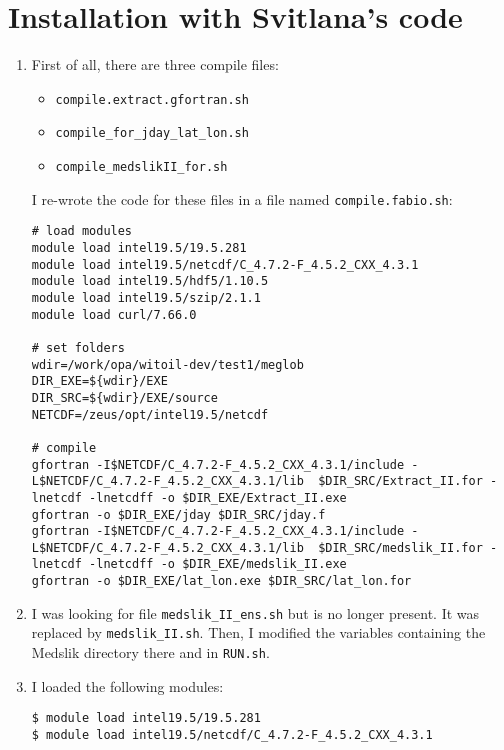 \section{Installation with Svitlana's code}

\begin{enumerate}
    \item First of all, there are three compile files:
\begin{itemize}
    \item \texttt{compile.extract.gfortran.sh}
    \item \texttt{compile\_for\_jday\_lat\_lon.sh}
    \item \texttt{compile\_medslikII\_for.sh}
\end{itemize}

I re-wrote the code for these files in a file named \texttt{compile.fabio.sh}:

\begin{lstlisting}
# load modules
module load intel19.5/19.5.281
module load intel19.5/netcdf/C_4.7.2-F_4.5.2_CXX_4.3.1
module load intel19.5/hdf5/1.10.5
module load intel19.5/szip/2.1.1
module load curl/7.66.0

# set folders
wdir=/work/opa/witoil-dev/test1/meglob
DIR_EXE=${wdir}/EXE
DIR_SRC=${wdir}/EXE/source
NETCDF=/zeus/opt/intel19.5/netcdf

# compile
gfortran -I$NETCDF/C_4.7.2-F_4.5.2_CXX_4.3.1/include -L$NETCDF/C_4.7.2-F_4.5.2_CXX_4.3.1/lib  $DIR_SRC/Extract_II.for -lnetcdf -lnetcdff -o $DIR_EXE/Extract_II.exe
gfortran -o $DIR_EXE/jday $DIR_SRC/jday.f 
gfortran -I$NETCDF/C_4.7.2-F_4.5.2_CXX_4.3.1/include -L$NETCDF/C_4.7.2-F_4.5.2_CXX_4.3.1/lib  $DIR_SRC/medslik_II.for -lnetcdf -lnetcdff -o $DIR_EXE/medslik_II.exe
gfortran -o $DIR_EXE/lat_lon.exe $DIR_SRC/lat_lon.for

\end{lstlisting}

\item I was looking for file \texttt{medslik\_II\_ens.sh} but is no longer present. It was replaced by \texttt{medslik\_II.sh}. Then, I modified the variables containing the Medslik directory there and in \texttt{RUN.sh}.

\item I loaded the following modules:

\begin{lstlisting}
$ module load intel19.5/19.5.281
$ module load intel19.5/netcdf/C_4.7.2-F_4.5.2_CXX_4.3.1
\end{lstlisting}


\end{enumerate}
